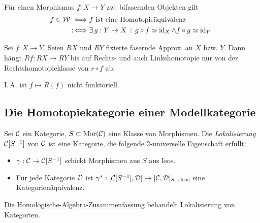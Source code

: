 \documentclass{cheat-sheet}
\newcommand{\Weak}{\mathcal{W}} %
\newcommand{\ModC}{\mathcal{M}} %
\DeclareMathOperator{\Ho}{Ho} %
\begin{document}
\begin{thm}\mbox{}\\
  Für einen Morphismus $f : X \to Y$ zw. bifasernden Objekten gilt
  \begin{align*}
    f \in \Weak \iff & \text{$f$ ist eine Homotopieäquivalenz} \\
    \coloniff & \ex{g : Y \to X} g \circ f \simeq \id_X \wedge f \circ g \simeq \id_Y.
  \end{align*}
\end{thm}

\begin{lem}
  Sei $f : X \to Y$. Seien $RX$ und $RY$ fixierte fasernde Approx. an $X$ bzw. $Y$.
  Dann hängt $Rf : RX \to RY$ bis auf Rechts- und auch Linkshomotopie nur von der Rechtshomotopieklasse von $r \circ f$ ab.
\end{lem}

\begin{acht}
  I.\,A. ist $f \mapsto R(f)$ nicht funktoriell.
\end{acht}

\subsection{Die Homotopiekategorie einer Modellkategorie}



\begin{defn}
  Sei $\mathcal{C}$ ein Kategorie, $S \subset \operatorname{Mor}(\mathcal{C})$ eine Klasse von Morphismen. Die \emph{Lokalisierung} $\mathcal{C}[S^{-1}]$ von $\mathcal{C}$ ist eine Kategorie, die folgende 2-universelle Eigenschaft erfüllt:
  \begin{itemize}
    \item $\gamma : \mathcal{C} \to \mathcal{C}[S^{-1}]$ schickt Morphismen aus $S$ aus Isos.
    \item Für jede Kategorie $\mathcal{D}$ ist $\gamma^* : [\mathcal{C}[S^{-1}], \mathcal{D}] \to [\mathcal{C}, \mathcal{D}]_{S \mapsto \text{Isos}}$ eine Kategorienäquivalenz.
  \end{itemize}
\end{defn}

\begin{bem}
  Die \href{http://timbaumann.info/uni-spicker/homoalg.pdf}{Homologische-Algebra-Zusammenfassung} behandelt Lokalisierung von Kategorien.
\end{bem}
\end{document}
